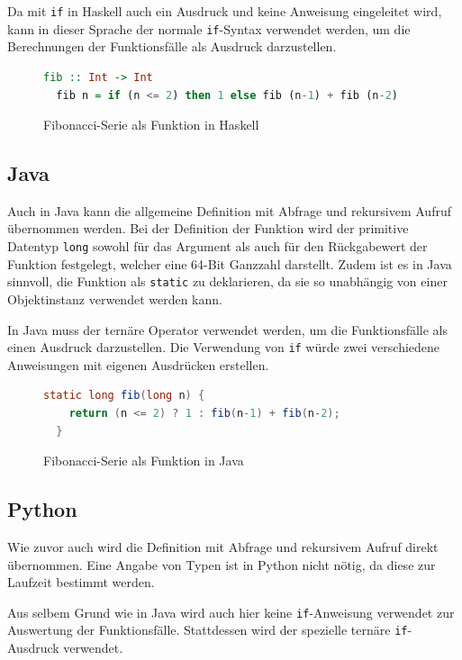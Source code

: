 \documentclass[11pt, parskip=half]{scrartcl}       %
\begin{document}
Da mit \texttt{if} in Haskell auch ein Ausdruck und keine Anweisung eingeleitet wird, kann in dieser Sprache der normale \texttt{if}-Syntax verwendet werden, um die Berechnungen der Funktionsfälle als Ausdruck darzustellen.

\begin{figure}[h]
  \centering
\begin{lstlisting}[language=haskell]
  fib :: Int -> Int
  fib n = if (n <= 2) then 1 else fib (n-1) + fib (n-2)
\end{lstlisting}  
  \caption{Fibonacci-Serie als Funktion in Haskell}
  \label{fig:code-haskell}
\end{figure}

\subsection{Java}

Auch in Java kann die allgemeine Definition mit Abfrage und rekursivem Aufruf übernommen werden.
Bei der Definition der Funktion wird der primitive Datentyp \texttt{long} sowohl für das Argument als auch für den Rückgabewert der Funktion festgelegt, welcher eine 64-Bit Ganzzahl darstellt.
Zudem ist es in Java sinnvoll, die Funktion als \texttt{static} zu deklarieren, da sie so unabhängig von einer Objektinstanz verwendet werden kann.

In Java muss der ternäre Operator verwendet werden, um die Funktionsfälle als einen Ausdruck darzustellen.
Die Verwendung von \texttt{if} würde zwei verschiedene Anweisungen mit eigenen Ausdrücken erstellen.

\begin{figure}[h]
  \centering
\begin{lstlisting}[language=java]
  static long fib(long n) {
    return (n <= 2) ? 1 : fib(n-1) + fib(n-2);
  }
\end{lstlisting}  
  \caption{Fibonacci-Serie als Funktion in Java}
  \label{fig:code-java}
\end{figure}


\subsection{Python}

Wie zuvor auch wird die Definition mit Abfrage und rekursivem Aufruf direkt übernommen.
Eine Angabe von Typen ist in Python nicht nötig, da diese zur Laufzeit bestimmt werden.

Aus selbem Grund wie in Java wird auch hier keine \texttt{if}-Anweisung verwendet zur Auswertung der Funktionsfälle.
Stattdessen wird der spezielle ternäre \texttt{if}-Ausdruck verwendet.
\end{document}
